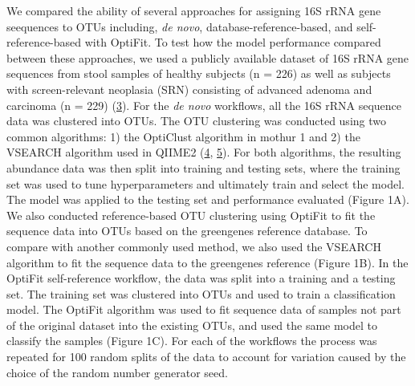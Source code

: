 \documentclass[
]{article}
\begin{document}
We compared the ability of several approaches for assigning 16S rRNA
gene seequences to OTUs including, \emph{de novo},
database-reference-based, and self-reference-based with OptiFit. To test
how the model performance compared between these approaches, we used a
publicly available dataset of 16S rRNA gene sequences from stool samples
of healthy subjects (n = 226) as well as subjects with screen-relevant
neoplasia (SRN) consisting of advanced adenoma and carcinoma (n = 229)
(\protect\hyperlink{ref-baxter2016}{3}). For the \emph{de novo}
workflows, all the 16S rRNA sequence data was clustered into OTUs. The
OTU clustering was conducted using two common algorithms: 1) the
OptiClust algorithm in mothur 1 and 2) the VSEARCH algorithm used in
QIIME2 (\protect\hyperlink{ref-rognes2016}{4},
\protect\hyperlink{ref-bolyen2019}{5}). For both algorithms, the
resulting abundance data was then split into training and testing sets,
where the training set was used to tune hyperparameters and ultimately
train and select the model. The model was applied to the testing set and
performance evaluated (Figure 1A). We also conducted reference-based OTU
clustering using OptiFit to fit the sequence data into OTUs based on the
greengenes reference database. To compare with another commonly used
method, we also used the VSEARCH algorithm to fit the sequence data to
the greengenes reference (Figure 1B). In the OptiFit self-reference
workflow, the data was split into a training and a testing set. The
training set was clustered into OTUs and used to train a classification
model. The OptiFit algorithm was used to fit sequence data of samples
not part of the original dataset into the existing OTUs, and used the
same model to classify the samples (Figure 1C). For each of the
workflows the process was repeated for 100 random splits of the data to
account for variation caused by the choice of the random number
generator seed.
\end{document}
